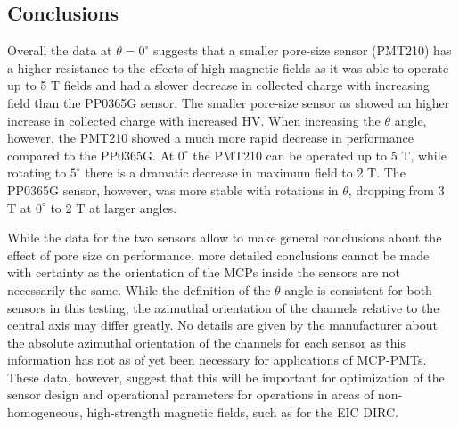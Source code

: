 \subsection{Conclusions}
Overall the data at $\theta = 0^{\circ}$ suggests that a smaller pore-size sensor (PMT210) has a higher resistance to the effects of high magnetic fields as it was able to operate up to 5 T fields and had a slower decrease in collected charge with increasing field than the PP0365G sensor. The smaller pore-size sensor as showed an higher increase in collected charge with increased HV. When increasing the $\theta$ angle, however, the PMT210 showed a much more rapid decrease in performance compared to the PP0365G. At $0^{\circ}$ the PMT210 can be operated up to 5 T, while rotating to $5^{\circ}$ there is a dramatic decrease in maximum field to 2 T. The PP0365G sensor, however, was more stable with rotations in $\theta$, dropping from 3 T at $0^{\circ}$ to 2 T at larger angles.

While the data for the two sensors allow to make general conclusions about the effect of pore size on performance, more detailed conclusions cannot be made with certainty as the orientation of the MCPs inside the sensors are not necessarily the same. While the definition of the $\theta$ angle is consistent for both sensors in this testing, the azimuthal orientation of the channels relative to the central axis may differ greatly. No details are given by the manufacturer about the absolute azimuthal orientation of the channels for each sensor as this information has not as of yet been necessary for applications of MCP-PMTs. These data, however, suggest that this will be important for optimization of the sensor design and operational parameters for operations in areas of non-homogeneous, high-strength magnetic fields, such as for the EIC DIRC.
